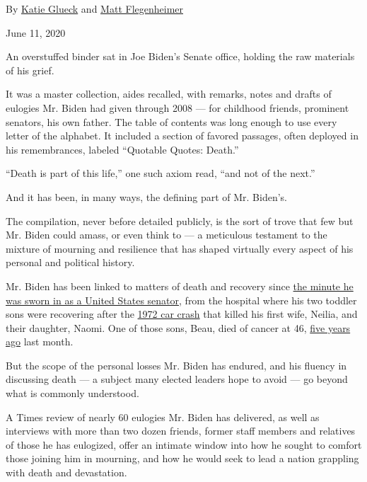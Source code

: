 By \href{https://www.nytimes.com/by/katie-glueck}{Katie Glueck} and
\href{https://www.nytimes.com/by/matt-flegenheimer}{Matt Flegenheimer}

June 11, 2020

An overstuffed binder sat in Joe Biden's Senate office, holding the raw
materials of his grief.

It was a master collection, aides recalled, with remarks, notes and
drafts of eulogies Mr. Biden had given through 2008 --- for childhood
friends, prominent senators, his own father. The table of contents was
long enough to use every letter of the alphabet. It included a section
of favored passages, often deployed in his remembrances, labeled
``Quotable Quotes: Death.''

``Death is part of this life,'' one such axiom read, ``and not of the
next.''

And it has been, in many ways, the defining part of Mr. Biden's.

The compilation, never before detailed publicly, is the sort of trove
that few but Mr. Biden could amass, or even think to --- a meticulous
testament to the mixture of mourning and resilience that has shaped
virtually every aspect of his personal and political history.

Mr. Biden has been linked to matters of death and recovery since
\href{https://www.nytimes.com/1973/01/03/archives/biden-takes-oath-friday.html}{the
minute he was sworn in as a United States senator}, from the hospital
where his two toddler sons were recovering after the
\href{https://www.nytimes.com/1972/12/19/archives/bidens-wife-child-killed-in-car-crash.html}{1972
car crash} that killed his first wife, Neilia, and their daughter,
Naomi. One of those sons, Beau, died of cancer at 46,
\href{https://www.nytimes.com/2015/05/31/us/politics/joseph-r-biden-iii-vice-presidents-son-beau-dies-at-46.html}{five
years ago} last month.

But the scope of the personal losses Mr. Biden has endured, and his
fluency in discussing death --- a subject many elected leaders hope to
avoid --- go beyond what is commonly understood.

A Times review of nearly 60 eulogies Mr. Biden has delivered, as well as
interviews with more than two dozen friends, former staff members and
relatives of those he has eulogized, offer an intimate window into how
he sought to comfort those joining him in mourning, and how he would
seek to lead a nation grappling with death and devastation.

